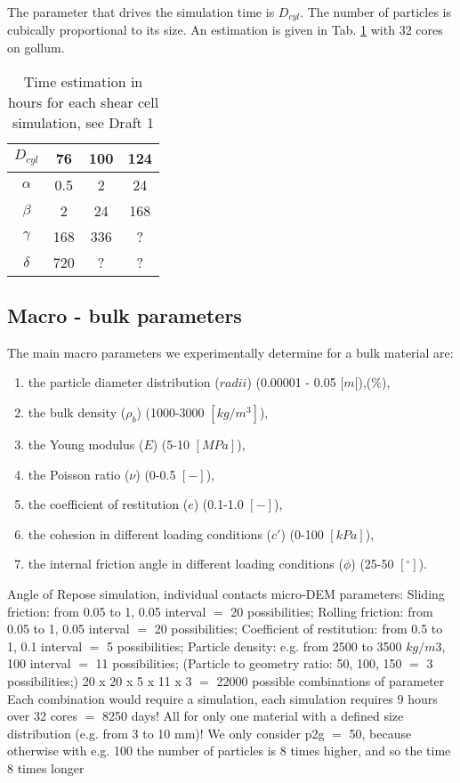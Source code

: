 The parameter that drives the simulation time is $D_{cyl}$. The number of particles is cubically proportional to its size. An estimation is given in Tab. \ref{tab:timestimation} with 32 cores on gollum.

\begin{table}[htbp]
  \centering
  \caption{Time estimation in hours for each shear cell simulation, see Draft 1}
    \begin{tabular}{c|ccc}
    \toprule
    $D_{cyl}$ & 76    & 100   & 124 \\
    \midrule
    $\alpha$ & 0.5   & 2     & 24 \\
    $\beta$ & 2     & 24    & 168 \\
    $\gamma$ & 168   & 336   & ? \\
    $\delta$ & 720   & ?     & ? \\
    \bottomrule
    \end{tabular}%
  \label{tab:timestimation}%
\end{table}%


\subsection{Macro - bulk parameters}
\label{subsection:macroparameters}

The main macro parameters we experimentally determine for a bulk material are:

\begin{enumerate}[label=(\alph*)]
\item{the particle diameter distribution ($radii$) (0.00001 - 0.05 $[m[$),(\%),}
\item{the bulk density ($\rho_b$) (1000-3000 $[kg/m^3]$),}
\item{the Young modulus ($E$) (5-10 $[MPa]$),}
\item{the Poisson ratio ($\nu$) (0-0.5 $[-]$),}
\item{the coefficient of restitution ($e$) (0.1-1.0 $[-]$),}
\item{the cohesion in different loading conditions ($c'$) (0-100 $[kPa]$),}
\item{the internal friction angle in different loading conditions ($\phi$) (25-50 $[^\circ]$).}
\end{enumerate}

Angle of Repose simulation, individual contacts micro-DEM parameters:
Sliding friction: from 0.05 to 1, 0.05 interval $=$ 20 possibilities;
Rolling friction: from 0.05 to 1, 0.05 interval $=$ 20 possibilities;
Coefficient  of restitution: from 0.5 to 1, 0.1 interval $=$ 5 possibilities;
Particle density: e.g. from 2500 to 3500 $kg/m3$, 100 interval $=$ 11 possibilities;
(Particle to geometry ratio: 50, 100, 150 $=$ 3 possibilities;)
20 x 20 x 5 x 11 x 3 $=$ 22000 possible combinations of parameter
Each combination would require a simulation, each simulation requires 9 hours over 32 cores $=$ 8250 days!
All for only one material with a defined size distribution (e.g. from 3 to 10 mm)!
We only consider p2g $=$ 50, because otherwise with e.g. 100 the number of particles is 8 times higher, and so the time 8 times longer

